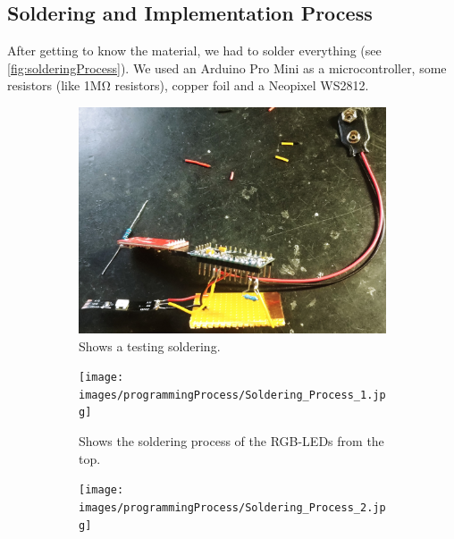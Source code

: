 \documentclass[04_projectProcess.tex]{subfiles}
\begin{document}
    \subsection{Soldering and Implementation Process}
    \begin{flushleft}
        After getting to know the material, we had to solder everything (see \ref{fig:solderingProcess}).
        We used an Arduino Pro Mini \cite{arduinoProMini} as a microcontroller, some resistors (like 
        1M\si{\ohm} resistors), copper foil and a Neopixel WS2812. \\      
        
        \begin{figure}[H]
            \centering
            \begin{subfigure}{.45\textwidth}
            \centering
            \includegraphics[width=0.8\linewidth]{images/programmingProcess/solderingProcess.jpg}
            \caption{Shows a testing soldering.}
            \label{fig:solderingProcess_0}
            \vspace{6mm}
            \end{subfigure}
            \begin{subfigure}{.45\textwidth}
                \centering
                \texttt{[image: images/programmingProcess/Soldering\_Process\_1.jpg]}
                \caption{Shows the soldering process of the RGB-LEDs from the top.}
                \label{fig:solderingProcess_1}
                \vspace{6mm}
            \end{subfigure}
            \hspace{1mm}
            \begin{subfigure}{.45\textwidth}
                \centering
                \texttt{[image: images/programmingProcess/Soldering\_Process\_2.jpg]}

\end{subfigure}
\end{figure}
\end{flushleft}
\end{document}
